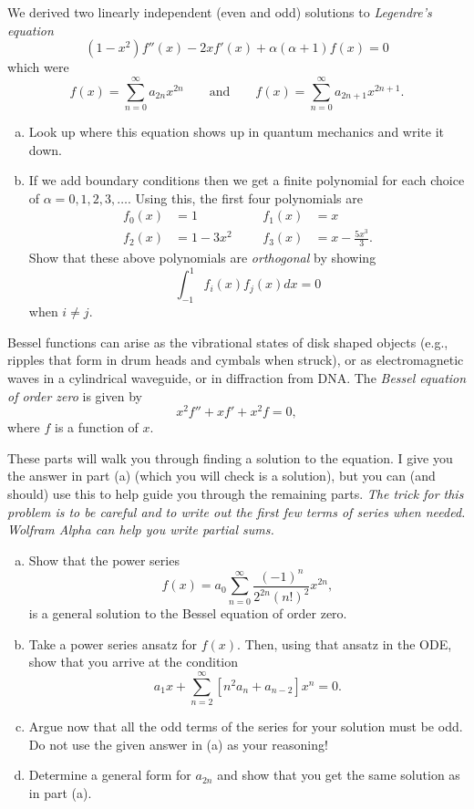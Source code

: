 \begin{problem}
We derived two linearly independent (even and odd) solutions to \emph{Legendre's equation}
\[
(1-x^2)f''(x)-2xf'(x)+\alpha(\alpha+1)f(x)=0
\]
which were
\[
f(x)=\sum_{n=0}^\infty a_{2n}x^{2n} \qquad \textrm{and} \qquad f(x)=\sum_{n=0}^\infty a_{2n+1}x^{2n+1}.
\]
\begin{enumerate}[(a)]
    \item Look up where this equation shows up in quantum mechanics and write it down.
    \item If we add boundary conditions then we get a finite polynomial for each choice of $\alpha = 0,1,2,3,\dots$. Using this, the first four polynomials are
    \begin{align*}
        f_0(x)&=1 &&& f_1(x)&=x\\
        f_2(x)&=1-3x^2 &&& f_3(x)&=x-\frac{5x^3}{3}.
    \end{align*}
    Show that these above polynomials are \emph{orthogonal} by showing
    \[
    \int_{-1}^1 f_i(x)f_j(x)dx = 0
    \]
    when $i\neq j$.
\end{enumerate}
\end{problem}

\begin{problem}
Bessel functions can arise as the vibrational states of disk shaped objects (e.g., ripples that form in drum heads and cymbals when struck), or as electromagnetic waves in a cylindrical waveguide, or in diffraction from DNA.  The \emph{Bessel equation of order zero} is given by
\[
x^2 f''+xf'+x^2f =0,
\]
where $f$ is a function of $x$.

These parts will walk you through finding a solution to the equation.  I give you the answer in part (a) (which you will check is a solution), but you can (and should) use this to help guide you through the remaining parts. \emph{The trick for this problem is to be careful and to write out the first few terms of series when needed. Wolfram Alpha can help you write partial sums.}
\begin{enumerate}[(a)]
    \item Show that the power series
    \[
        f(x) = a_0 \sum_{n=0}^\infty \frac{(-1)^n}{2^{2n} (n!)^2} x^{2n},
    \]
    is a general solution to the Bessel equation of order zero.
    \item Take a power series ansatz for $f(x)$.  Then, using that ansatz in the ODE, show that you arrive at the condition
    \[
        a_1x + \sum_{n=2}^\infty \left[ n^2 a_n + a_{n-2} \right]x^n = 0.
    \]
    \item Argue now that all the odd terms of the series for your solution must be odd. Do not use the given answer in (a) as your reasoning!
    \item Determine a general form for $a_{2n}$ and show that you get the same solution as in part (a).
\end{enumerate}
\end{problem}

